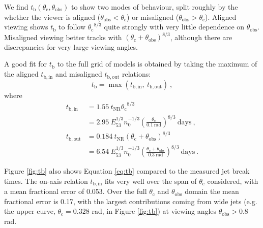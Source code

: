 \documentclass[twocolumn]{aastex62}
\newcommand{\tNR}{\ensuremath{t_{\mathrm{NR}}}}
\newcommand{\tb}{\ensuremath{t_{\mathrm{b}}}}
\newcommand{\tbin}{\ensuremath{t_{\mathrm{b, in}}}}
\newcommand{\tbout}{\ensuremath{t_{\mathrm{b, out}}}}
\newcommand{\thobs}{\ensuremath{\theta_{\mathrm{obs}}}}
\newcommand{\thC}{\ensuremath{\theta_{\mathrm{c}}}}
\begin{document}
We find $\tb(\thC, \thobs)$ to show two modes of behaviour, split roughly by the whether the viewer is aligned ($\thobs < \thC$) or misaligned ($\thobs > \thC$).  Aligned viewing shows $\tb$ to follow $\thC^{8/3}$ quite strongly with very little dependence on $\thobs$.  Misaligned viewing better tracks with $(\thC + \thobs)^{8/3}$, although there are discrepancies for very large viewing angles.

A good fit for $\tb$ to the full grid of models is obtained by taking the maximum of the aligned $\tbin$ and misaligned $\tbout$ relations:
\begin{equation}
	\tb = \max(\tbin,\  \tbout)\ , \label{eq:tb}
\end{equation}
where
\begin{align}
	\tbin &= 1.55\ \tNR \thC^{8/3} \label{eq:tbin}\\
		&= 2.95\ E_{53}^{1/3} n_0^{-1/3} \left(\frac{\thC}{0.1\ \mathrm{rad}}\right)^{8/3}\ \mathrm{days}\ , \nonumber \\
	\tbout &= 0.184\ \tNR (\thC+\thobs)^{8/3} \label{eq:tbout} \\
		&= 6.54\ E_{53}^{1/3} n_0^{-1/3} \left(\frac{\thC+\thobs}{0.3\ \mathrm{rad}}\right)^{8/3}\ \mathrm{days}\ . \nonumber 			
\end{align}

Figure \ref{fig:tb} also shows Equation \eqref{eq:tb} compared to the measured jet break times.  The on-axis relation $\tbin$ fits very well over the span of $\thC$ considered, with a mean fractional error of 0.053.  Over the full $\thC$ and $\thobs$ domain the mean fractional error is 0.17, with the largest contributions coming from wide jets (e.g. the upper curve, $\thC = 0.328$ rad, in Figure \ref{fig:tb}) at viewing angles $\thobs > 0.8$ rad.


\end{document}
